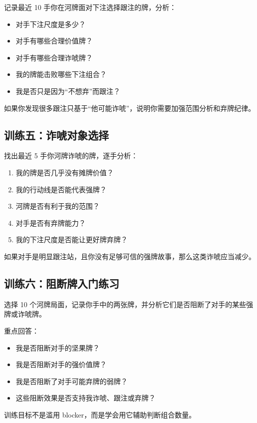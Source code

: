 记录最近 10 手你在河牌面对下注选择跟注的牌，分析：

\begin{itemize}
\item 对手下注尺度是多少？
\item 对手有哪些合理价值牌？
\item 对手有哪些合理诈唬牌？
\item 我的牌能击败哪些下注组合？
\item 我是否只是因为“不想弃”而跟注？
\end{itemize}

如果你发现很多跟注只基于“他可能诈唬”，说明你需要加强范围分析和弃牌纪律。

\subsection*{训练五：诈唬对象选择}

找出最近 5 手你河牌诈唬的牌，逐手分析：

\begin{enumerate}
\item 我的牌是否几乎没有摊牌价值？
\item 我的行动线是否能代表强牌？
\item 河牌是否有利于我的范围？
\item 对手是否有弃牌能力？
\item 我的下注尺度是否能让更好牌弃牌？
\end{enumerate}

如果对手是明显跟注站，且你没有足够可信的强牌故事，那么这类诈唬应当减少。

\subsection*{训练六：阻断牌入门练习}

选择 10 个河牌局面，记录你手中的两张牌，并分析它们是否阻断了对手的某些强牌或诈唬牌。

重点回答：

\begin{itemize}
\item 我是否阻断对手的坚果牌？
\item 我是否阻断对手的强价值牌？
\item 我是否阻断了对手可能弃牌的弱牌？
\item 这些阻断效果是否支持我诈唬、跟注或弃牌？
\end{itemize}

训练目标不是滥用 blocker，而是学会用它辅助判断组合数量。
